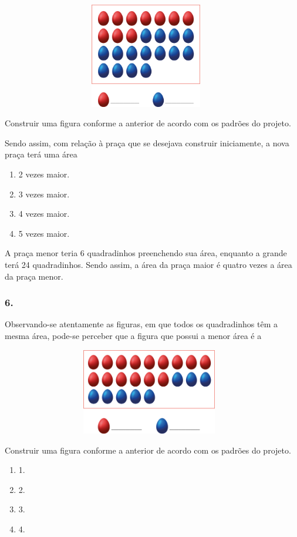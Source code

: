 \begin{enumerate}
\begin{escolha}
\begin{enumerate}
\begin{itemize}
\begin{itemize}
\begin{escolha}
\includegraphics[width=5.00877in,height=1.80849in]{media/image64.png}

Construir uma figura conforme a anterior de acordo com os padrões do
projeto.

Sendo assim, com relação à praça que se desejava construir iniciamente,
a nova praça terá uma área

\begin{enumerate}
\def\labelenumi{\alph{enumi})}
\item
  2 vezes maior.
\item
  3 vezes maior.
\item
  4 vezes maior.
\item
  5 vezes maior.
\end{enumerate}

A praça menor teria 6 quadradinhos preenchendo sua área, enquanto a
grande terá 24 quadradinhos. Sendo assim, a área da praça maior é
quatro vezes a área da praça menor.

\subsubsection{6.}\label{section-57}

Observando-se atentamente as figuras, em que todos os quadradinhos têm a mesma área, pode-se perceber que a figura que
possui a menor área é a

\includegraphics[width=5.12179in,height=1.48342in]{media/image65.png}

Construir uma figura conforme a anterior de acordo com os padrões do
projeto.

\begin{enumerate}
\def\labelenumi{\alph{enumi})}
\item
  1.
\item
  2.
\item
  3.
\item
  4.
\end{enumerate}


\end{escolha}
\end{itemize}
\end{itemize}
\end{enumerate}
\end{escolha}
\end{enumerate}
